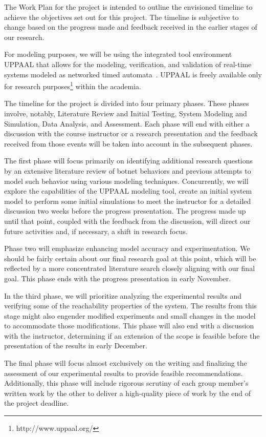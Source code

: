 The Work Plan for the project is intended to outline the envisioned timeline to achieve the objectives set out for this project. The timeline is subjective to change based on the progress made and feedback received in the earlier stages of our research.

For modeling purposes, we will be using the integrated tool environment UPPAAL that allows for the modeling, verification, and validation of real-time systems modeled as networked timed automata~\cite{behrmann2004_Tutorial_UPPAAL}. UPPAAL is freely available only for research purposes\footnote{http://www.uppaal.org/} within the academia.

The timeline for the project is divided into four primary phases. These phases involve, notably, Literature Review and Initial Testing, System Modeling and Simulation, Data Analysis, and Assessment. Each phase will end with either a discussion with the course instructor or a research presentation and the feedback received from those events will be taken into account in the subsequent phases.

The first phase will focus primarily on identifying additional research questions by an extensive literature review of botnet behaviors and previous attempts to model such behavior using various modeling techniques. Concurrently, we will explore the capabilities of the UPPAAL modeling tool, create an initial system model to perform some initial simulations to meet the instructor for a detailed discussion two weeks before the progress presentation. The progress made up until that point, coupled with the feedback from the discussion, will direct our future activities and, if necessary, a shift in research focus.

Phase two will emphasize enhancing model accuracy and experimentation. We should be fairly certain about our final research goal at this point, which will be reflected by a more concentrated literature search closely aligning with our final goal. This phase ends with the progress presentation in early November.

In the third phase, we will prioritize analyzing the experimental results and verifying some of the reachability properties of the system. The results from this stage might also engender modified experiments and small changes in the model to accommodate those modifications. This phase will also end with a discussion with the instructor, determining if an extension of the scope is feasible before the presentation of the results in early December.

The final phase will focus almost exclusively on the writing and finalizing the assessment of our experimental results to provide feasible recommendations. Additionally, this phase will include rigorous scrutiny of each group member's written work by the other to deliver a high-quality piece of work by the end of the project deadline.
